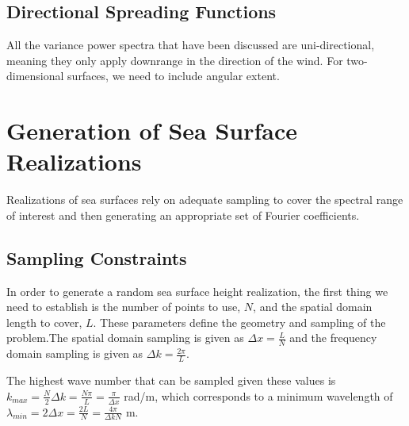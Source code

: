 \renewcommand{\baselinestretch}{2} \small\normalsize

\subsection{Directional Spreading Functions}
All the variance power spectra that have been discussed are uni-directional, meaning they only apply downrange in the direction of the wind. For two-dimensional surfaces, we need to include angular extent.

\section{Generation of Sea Surface Realizations}
Realizations of sea surfaces rely on adequate sampling to cover the spectral range of interest and then generating an appropriate set of Fourier coefficients.

\subsection{Sampling Constraints}
In order to generate a random sea surface height realization,  the first thing we need to establish is the number of points to use, $N$, and the spatial domain length to cover, $L$. These parameters define the geometry and sampling of the problem.The spatial domain sampling is given as $\Delta x = \frac{L}{N}$ and the frequency domain sampling is  given as $\Delta k = \frac{2\pi}{L}$.

The highest wave number that can be sampled given these values is $k_{max} = \frac{N}{2}\Delta k = \frac{N\pi}{L} = \frac{\pi}{\Delta x}$ rad/m, which corresponds to a minimum wavelength of $\lambda_{min} = 2\Delta x = \frac{2L}{N} = \frac{4\pi}{\Delta k N}$ m.

